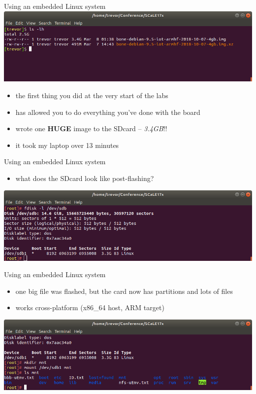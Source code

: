 \documentclass[aspectratio=169,obeyspaces,spaces,hyphens,dvipsnames]{beamer}
\begin{document}
\begin{frame}{Using an embedded Linux system}
  \includegraphics[width=\textwidth]{woerner/imgsize.png}
  \vspace{0.1cm}
  \begin{itemize}
    \item the first thing you did at the very start of the labs
    \item has allowed you to do everything you've done with the board
    \item wrote one {\bf HUGE} image to the SDcard -- \textit{3.4GB}!!
    \item it took my laptop over 13 minutes
  \end{itemize}
\end{frame}

\begin{frame}{Using an embedded Linux system}
  \begin{itemize}
    \item what does the SDcard look like post-flashing?
  \end{itemize}
  \includegraphics[width=\textwidth]{woerner/fdisk.png}
\end{frame}

\begin{frame}{Using an embedded Linux system}
  \begin{itemize}
    \item one big file was flashed, but the card now has partitions and lots of files
    \item works cross-platform (x86\_64 host, ARM target)
  \end{itemize}
  \includegraphics[width=\textwidth]{woerner/mount-sd.png}
\end{frame}
\end{document}
